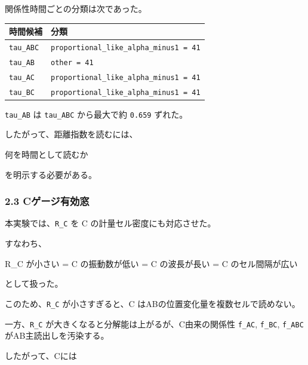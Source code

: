 \documentclass[
]{article}
\newenvironment{Shaded}{}{}
\newcommand{\NormalTok}[1]{#1}
\newcounter{none} %
\begin{document}
関係性時間ごとの分類は次であった。

{\def\LTcaptype{none} %
\begin{longtable}[]{@{}ll@{}}
\toprule\noalign{}
時間候補 & 分類 \\
\midrule\noalign{}
\endhead
\bottomrule\noalign{}
\endlastfoot
\texttt{tau\_ABC} & \texttt{proportional\_like\_alpha\_minus1\ =\ 41} \\
\texttt{tau\_AB} & \texttt{other\ =\ 41} \\
\texttt{tau\_AC} & \texttt{proportional\_like\_alpha\_minus1\ =\ 41} \\
\texttt{tau\_BC} & \texttt{proportional\_like\_alpha\_minus1\ =\ 41} \\
\end{longtable}
}

\texttt{tau\_AB} は \texttt{tau\_ABC} から最大で約 \texttt{0.659}
ずれた。

したがって、距離指数を読むには、

\begin{Shaded}
\begin{Highlighting}[]
\NormalTok{何を時間として読むか}
\end{Highlighting}
\end{Shaded}

を明示する必要がある。

\subsubsection{2.3
Cゲージ有効窓}\label{cux30b2ux30fcux30b8ux6709ux52b9ux7a93}

本実験では、\texttt{R\_C} を C の計量セル密度にも対応させた。

すなわち、

\begin{Shaded}
\begin{Highlighting}[]
\NormalTok{R\_C が小さい}
\NormalTok{= C の振動数が低い}
\NormalTok{= C の波長が長い}
\NormalTok{= C のセル間隔が広い}
\end{Highlighting}
\end{Shaded}

として扱った。

このため、\texttt{R\_C} が小さすぎると、C
はABの位置変化量を複数セルで読めない。

一方、\texttt{R\_C} が大きくなると分解能は上がるが、C由来の関係性
\texttt{f\_AC}, \texttt{f\_BC}, \texttt{f\_ABC} がAB主読出しを汚染する。

したがって、Cには
\end{document}
